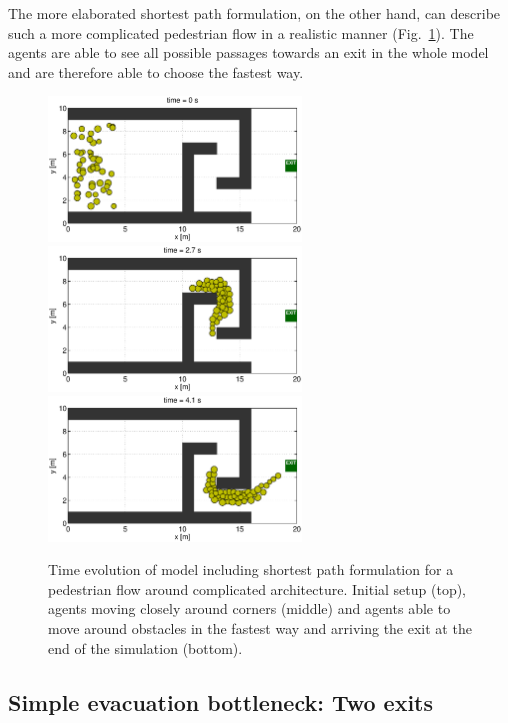 \documentclass[11pt]{article}
\begin{document}
The more elaborated shortest path formulation, on the other hand, can describe such a more complicated pedestrian flow in a realistic manner (Fig.~\ref{fig:simple4}). The agents are able to see all possible passages towards an exit in the whole model and are therefore able to choose the fastest way.

\begin{figure}
	\begin{center}
	\includegraphics[width=0.6\textwidth]
	{figures/Model2_fastest_1_000000.eps}
	\qquad
	\includegraphics[width=0.6\textwidth]
	{figures/Model2_fastest_1_000270.eps}
	\qquad
	\includegraphics[width=0.6\textwidth]
	{figures/Model2_fastest_1_000410.eps}
	\caption{Time evolution of model including shortest path formulation for a pedestrian flow around complicated architecture. Initial setup (top), agents moving closely around corners (middle) and agents able to move around obstacles in the fastest way and arriving the exit at the end of the simulation (bottom).}
	\label{fig:simple4}
	\end{center}
\end{figure}

\subsection{Simple evacuation bottleneck: Two exits}
\end{document}
